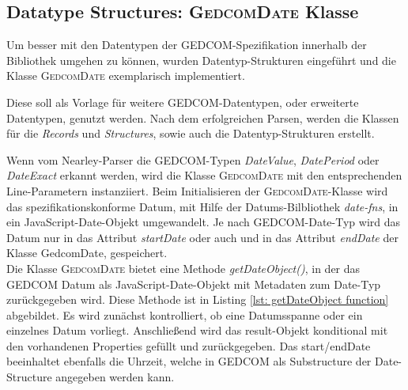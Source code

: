 \subsection{Datatype Structures: \textsc{GedcomDate} Klasse}
Um besser mit den Datentypen der GEDCOM-Spezifikation innerhalb der Bibliothek umgehen zu können, 
wurden Datentyp-Strukturen eingeführt und die Klasse \textsc{GedcomDate} exemplarisch implementiert.

Diese soll als Vorlage für weitere GEDCOM-Datentypen, oder erweiterte Datentypen, genutzt werden.
Nach dem erfolgreichen Parsen, werden die Klassen für die \textit{Records} und \textit{Structures}, 
sowie auch die Datentyp-Strukturen erstellt.

Wenn vom Nearley-Parser die GEDCOM-Typen \textit{DateValue}, \textit{DatePeriod} oder \textit{DateExact}
erkannt werden, wird die Klasse \textsc{GedcomDate} mit den entsprechenden Line-Parametern instanziiert.
Beim Initialisieren der \textsc{GedcomDate}-Klasse wird das spezifikationskonforme Datum, mit Hilfe der 
Datums-Bilbliothek \textit{date-fns}, in ein JavaScript-Date-Objekt umgewandelt.
Je nach GEDCOM-Date-Typ wird das Datum nur in das Attribut \textit{startDate} oder auch und in das Attribut
\textit{endDate} der Klasse GedcomDate, gespeichert. \\
Die Klasse \textsc{GedcomDate} bietet eine Methode \textit{getDateObject()}, in der das GEDCOM Datum 
als JavaScript-Date-Objekt mit Metadaten zum Date-Typ zurückgegeben wird.
Diese Methode ist in Listing \ref{lst: getDateObject function} abgebildet. Es wird zunächst kontrolliert,
ob eine Datumsspanne oder ein einzelnes Datum vorliegt. Anschließend wird das result-Objekt konditional
mit den vorhandenen Properties gefüllt und zurückgegeben. Das start/endDate beeinhaltet ebenfalls die Uhrzeit, 
welche in GEDCOM als Substructure der Date-Structure angegeben werden kann.

\newpage


